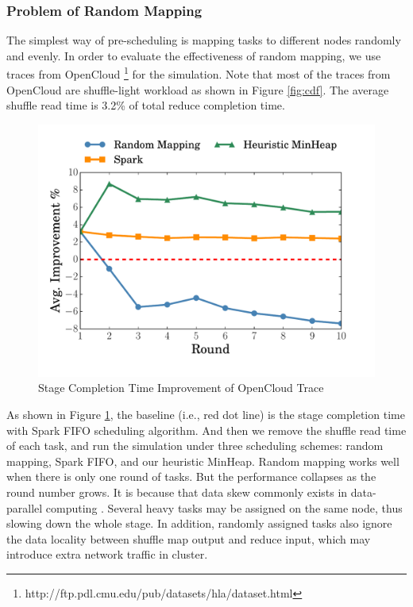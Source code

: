 \subsubsection{Problem of Random Mapping}\label{randomassign}
The simplest way of pre-scheduling is mapping tasks to different nodes randomly and evenly. 
In order to evaluate the effectiveness of random mapping, we use traces from OpenCloud \footnote{\label{fn:trace}http://ftp.pdl.cmu.edu/pub/datasets/hla/dataset.html} for the simulation.
Note that most of the traces from OpenCloud are shuffle-light workload as shown in Figure \ref{fig:cdf}. 
The average shuffle read time is 3.2\% of total reduce completion time.
\begin{figure}
	\centering
	\includegraphics[width=0.6\linewidth]{fig/sim}
	\caption{Stage Completion Time Improvement of OpenCloud Trace}
	\label{fig:sim}
	\vspace{-1em}
\end{figure}
As shown in Figure \ref{fig:sim}, the baseline (i.e., red dot line) is the stage completion time with Spark FIFO scheduling algorithm. 
And then we remove the shuffle read time of each task, and run the simulation under three scheduling schemes: random mapping, Spark FIFO, and our heuristic MinHeap.
Random mapping works well when there is only one round of tasks. 
But the performance collapses as the round number grows. 
It is because that data skew commonly exists in data-parallel computing \cite{skewtune, reining, gufler2012load}. 
Several heavy tasks may be assigned on the same node, thus slowing down the whole stage. 
In addition, randomly assigned tasks also ignore the data locality between shuffle map output and reduce input, which may introduce extra network traffic in cluster.

